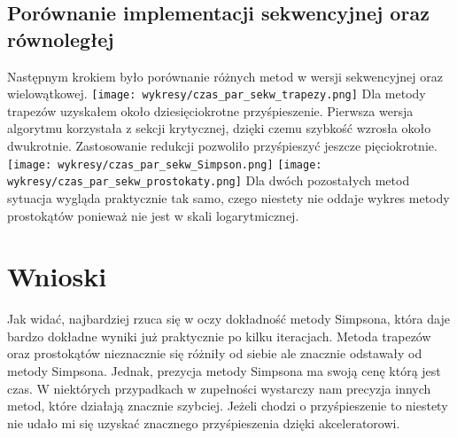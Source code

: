 \documentclass {report}
\begin{document}
\subsection {Porównanie implementacji sekwencyjnej oraz równoległej}
Następnym krokiem było porównanie różnych metod w wersji sekwencyjnej oraz wielowątkowej.
\newline
\texttt{[image: wykresy/czas\_par\_sekw\_trapezy.png]}
Dla metody trapezów uzyskałem około dziesięciokrotne przyśpieszenie. Pierwsza wersja algorytmu korzystała z sekcji krytycznej, dzięki czemu szybkość wzrosła około dwukrotnie. Zastosowanie redukcji pozwoliło przyśpieszyć jeszcze pięciokrotnie.
\newline
\texttt{[image: wykresy/czas\_par\_sekw\_Simpson.png]}
\newline
\texttt{[image: wykresy/czas\_par\_sekw\_prostokaty.png]}
Dla dwóch pozostałych metod sytuacja wygląda praktycznie tak samo, czego niestety nie oddaje wykres metody prostokątów ponieważ nie jest w skali logarytmicznej.
\newline

\section {Wnioski}
Jak widać, najbardziej rzuca się w oczy dokładność metody Simpsona, która daje bardzo dokładne wyniki już praktycznie po kilku iteracjach. Metoda trapezów oraz prostokątów nieznacznie się różniły od siebie ale znacznie odstawały od metody Simpsona.
\newline
Jednak, prezycja metody Simpsona ma swoją cenę którą jest czas. W niektórych przypadkach w zupełności wystarczy nam precyzja innych metod, które działają znacznie szybciej.
\newline
Jeżeli chodzi o przyśpieszenie to niestety nie udało mi się uzyskać znacznego przyśpieszenia dzięki akceleratorowi. 
\end{document}
